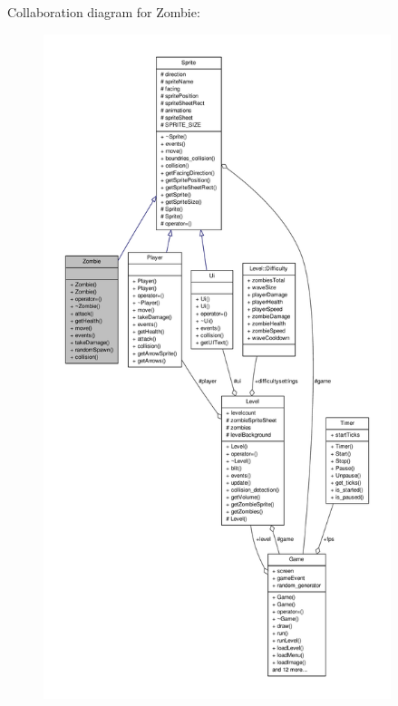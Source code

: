 Collaboration diagram for Zombie\-:
\nopagebreak
\begin{figure}[H]
\begin{center}
\leavevmode
\includegraphics[height=550pt]{classZombie__coll__graph}
\end{center}
\end{figure}

